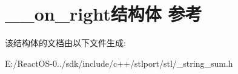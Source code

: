 \hypertarget{struct____on__right}{}\section{\+\_\+\+\_\+on\+\_\+right结构体 参考}
\label{struct____on__right}


该结构体的文档由以下文件生成\+:\begin{DoxyCompactItemize}
\item 
E\+:/\+React\+O\+S-\/0../sdk/include/c++/stlport/stl/\+\_\+string\+\_\+sum.\+h\end{DoxyCompactItemize}
